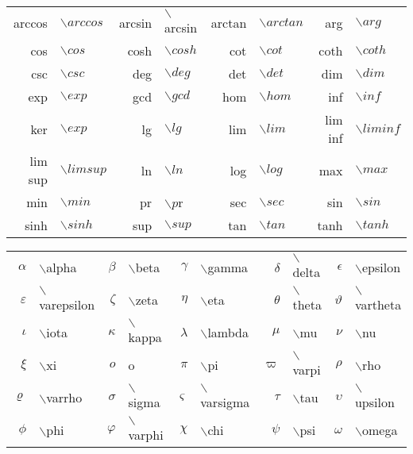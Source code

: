 \documentclass[a4paper, 12pt]{report}
\begin{document}
	\begin{table}
		\centering
		\begin{tabular}{rlrlrlrl}
			\hline
			arccos & $\backslash arccos$ & arcsin & $\backslash$ arcsin & arctan & $\backslash arctan$ & arg & $\backslash arg$\\
			cos & $\backslash cos$ & cosh & $\backslash cosh$ & cot & $\backslash cot$ & coth & $\backslash coth$\\
			csc & $\backslash csc$ & deg & $\backslash deg$ & det & $\backslash det$ & dim & $\backslash dim$ \\
			exp & $\backslash exp$ & gcd & $\backslash gcd$ & hom & $\backslash hom$ & inf &  $\backslash inf$\\
			ker & $\backslash exp$ & lg & $\backslash lg$ & lim & $\backslash lim$ & lim inf & $\backslash liminf$\\
			lim sup & $\backslash limsup$ & ln & $\backslash ln$ & log & $\backslash log$ & max & $\backslash max$\\
			min & $\backslash min$ & pr & $\backslash p$r & sec & $\backslash sec$ & sin & $\backslash sin$\\
			sinh & $\backslash sinh$ & sup & $\backslash sup$ & tan & $\backslash tan$ & tanh & $\backslash tanh$\\
			\hline
		\end{tabular}
	\end{table}

	\begin{table}
		\centering
		\begin{tabular}{rlrlrlrlrl}
			\hline
			$\alpha$ & $\backslash$alpha & $\beta$ & $\backslash$beta & $\gamma$ & $\backslash$gamma & $\delta$ & $\backslash$delta & $\epsilon$ & $\backslash$epsilon\\
			$\varepsilon$ & $\backslash$varepsilon & $\zeta$ & $\backslash$zeta & $\eta$ & $\backslash$eta & $\theta$ & $\backslash$theta & $\vartheta$ & $\backslash$vartheta\\
			$\iota$ & $\backslash$iota & $\kappa$ & $\backslash$kappa & $\lambda$ & $\backslash$lambda & $\mu$ & $\backslash$mu & $\nu$ & $\backslash$nu\\ 
			$\xi$ & $\backslash$xi & $o$ & o & $\pi$ & $\backslash$pi & $\varpi$ & $\backslash$varpi & $\rho$ & $\backslash$rho\\
			$\varrho$ & $\backslash$varrho & $\sigma$ & $\backslash$sigma & $\varsigma$ & $\backslash$varsigma & $\tau$ & $\backslash$tau & $\upsilon$ & $\backslash$upsilon\\
			$\phi$ & $\backslash$phi & $\varphi$ & $\backslash$varphi & $\chi$ & $\backslash$chi & $\psi$ & $\backslash$psi & $\omega$ & $\backslash$omega\\
			\hline
		\end{tabular}
	\end{table}
\end{document}
